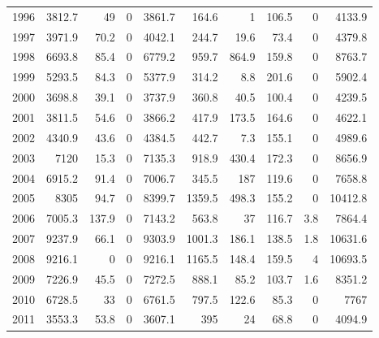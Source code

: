\documentclass[]{article}
\begin{document}
\begin{table}[ht]
\begin{tabular}{lrrrrrrrrr}
1996 & 3812.7         & 49            & 0       & 3861.7  & 164.6       & 1       & 106.5         & 0              & 4133.9      \\
1997 & 3971.9         & 70.2          & 0       & 4042.1  & 244.7       & 19.6    & 73.4          & 0              & 4379.8      \\
1998 & 6693.8         & 85.4          & 0       & 6779.2  & 959.7       & 864.9   & 159.8         & 0              & 8763.7      \\
1999 & 5293.5         & 84.3          & 0       & 5377.9  & 314.2       & 8.8     & 201.6         & 0              & 5902.4      \\
2000 & 3698.8         & 39.1          & 0       & 3737.9  & 360.8       & 40.5    & 100.4         & 0              & 4239.5      \\
2001 & 3811.5         & 54.6          & 0       & 3866.2  & 417.9       & 173.5   & 164.6         & 0              & 4622.1      \\
2002 & 4340.9         & 43.6          & 0       & 4384.5  & 442.7       & 7.3     & 155.1         & 0              & 4989.6      \\
2003 & 7120           & 15.3          & 0       & 7135.3  & 918.9       & 430.4   & 172.3         & 0              & 8656.9      \\
2004 & 6915.2         & 91.4          & 0       & 7006.7  & 345.5       & 187     & 119.6         & 0              & 7658.8      \\
2005 & 8305           & 94.7          & 0       & 8399.7  & 1359.5      & 498.3   & 155.2         & 0              & 10412.8     \\
2006 & 7005.3         & 137.9         & 0       & 7143.2  & 563.8       & 37      & 116.7         & 3.8            & 7864.4      \\
2007 & 9237.9         & 66.1          & 0       & 9303.9  & 1001.3      & 186.1   & 138.5         & 1.8            & 10631.6     \\
2008 & 9216.1         & 0             & 0       & 9216.1  & 1165.5      & 148.4   & 159.5         & 4              & 10693.5     \\
2009 & 7226.9         & 45.5          & 0       & 7272.5  & 888.1       & 85.2    & 103.7         & 1.6            & 8351.2      \\
2010 & 6728.5         & 33            & 0       & 6761.5  & 797.5       & 122.6   & 85.3          & 0              & 7767        \\
2011 & 3553.3         & 53.8          & 0       & 3607.1  & 395         & 24      & 68.8          & 0              & 4094.9      \\

\end{tabular}
\end{table}
\end{document}
